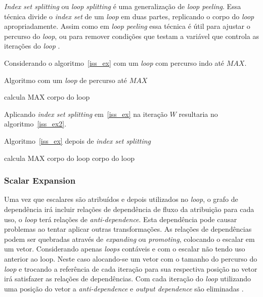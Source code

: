 \textit{Index set splitting} ou \textit{loop splitting} é uma generalização de 
\textit{loop peeling}. Essa técnica divide o \textit{index set} de um
\textit{loop} em duas partes, replicando o corpo do \textit{loop}
apropriadamente. 
Assim como em \textit{loop peeling} essa técnica é útil para ajustar o percurso
do \textit{loop}, ou para remover condições que testam a variável que controla
as iterações do \textit{loop} \cite{Ghodrat:2008} \cite{Tasharofi:2010}.

Considerando o algoritmo~\ref{iss_ex} com um \textit{loop} com percurso indo
até $MAX$.

\begin{algorithm}
\caption{Algoritmo com um \textit{loop} de percurso até $MAX$}
\label{iss_ex}
\begin{algorithmic}[1]

\STATE calcula MAX
\STATE corpo do loop
\ENDFOR

\end{algorithmic}
\end{algorithm}

Aplicando \textit{index set splitting} em~\ref{iss_ex} na iteração $W$
resultaria no algoritmo~\ref{iss_ex2}.

\begin{algorithm}
\caption{Algoritmo~\ref{iss_ex} depois de \textit{index set splitting}}
\label{iss_ex2}
\begin{algorithmic}[1]

\STATE calcula MAX
\STATE corpo do loop
\ENDFOR
{}
\STATE corpo do loop
\ENDFOR

\end{algorithmic}
\end{algorithm}


\subsubsection{Scalar Expansion} 

Uma vez que escalares são atribuídos e depois utilizados no \textit{loop}, o 
grafo de dependência irá incluir relações de dependência de fluxo da atribuição 
para cada uso, o \textit{loop} terá relações de \textit{anti-dependence}.
Esta dependência pode causar problemas ao tentar aplicar outras transformações.
As relações de dependências podem ser quebradas através de \textit{expanding} ou 
\textit{promoting}, colocando o escalar em um vetor.
Considerando apenas \textit{loops} contáveis e com o escalar não tendo uso
anterior ao loop. Neste caso alocando-se um vetor com o tamanho do percurso do
\textit{loop} e trocando a referência de cada iteração para sua respectiva
posição no vetor irá satisfazer as relações de dependências. Com cada iteração
do \textit{loop} utilizando uma posição do vetor a \textit{anti-dependence} e 
\textit{output dependence} são eliminadas \cite{Wolf:1996}.

